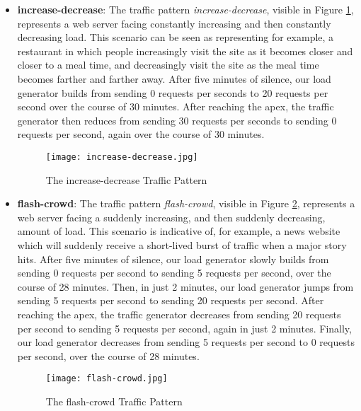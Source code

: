 \begin{itemize}
  \item \textbf{increase-decrease}: The traffic pattern
    \textit{increase-decrease}, visible in Figure \ref{fig:increase-decrease},
    represents a web server facing constantly increasing and then constantly
    decreasing load. This scenario can be seen as representing for example, a
    restaurant in which people increasingly visit the site as it becomes closer
    and closer to a meal time, and decreasingly visit the site as the meal time
    becomes farther and farther away. After five minutes of silence, our load
    generator builds from sending 0 requests per seconds to 20 requests per
    second over the course of 30 minutes. After reaching the apex, the traffic
    generator then reduces from sending 30 requests per seconds to sending 0
    requests per second, again over the course of 30 minutes.

    \begin{figure}[!h]
      \centerline{\texttt{[image: increase-decrease.jpg]}}
      \caption{The increase-decrease Traffic Pattern}
      \label{fig:increase-decrease}
    \end{figure}

  \item \textbf{flash-crowd}: The traffic pattern \textit{flash-crowd}, visible
    in Figure \ref{fig:flash-crowd}, represents a web server facing a suddenly
    increasing, and then suddenly decreasing, amount of load. This scenario is
    indicative of, for example, a news website which will suddenly receive a
    short-lived burst of traffic when a major story hits. After five minutes of
    silence, our load generator slowly builds from sending 0 requests per second
    to sending 5 requests per second, over the course of 28 minutes. Then, in
    just 2 minutes, our load generator jumps from sending 5 requests per second
    to sending 20 requests per second. After reaching the apex, the traffic
    generator decreases from sending 20 requests per second to sending 5
    requests per second, again in just 2 minutes. Finally, our load generator
    decreases from sending 5 requests per second to 0 requests per second, over
    the course of 28 minutes.

    \begin{figure}[!h]
      \centerline{\texttt{[image: flash-crowd.jpg]}}
      \caption{The flash-crowd Traffic Pattern}
      \label{fig:flash-crowd}
    \end{figure}

\end{itemize}
